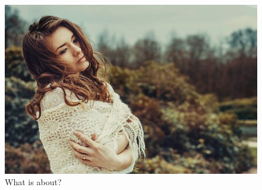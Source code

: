 \documentclass[a4paper]{article}
\begin{document}
\begin{figure}
  \includegraphics[width=\linewidth]{filename.jpg}
  \caption{What is about?}
  \label{fig:whateverlabel}
\end{figure}
\end{document}
